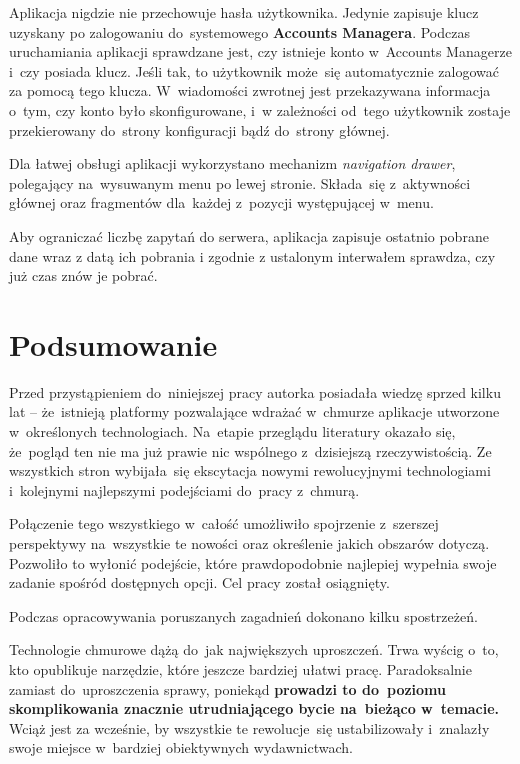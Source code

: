 \documentclass[12pt,a4paper,twoside,titlepage,openright]{book}
\begin{document}
Aplikacja nigdzie nie przechowuje hasła użytkownika. Jedynie zapisuje klucz uzyskany po zalogowaniu do~systemowego \textbf{Accounts Managera}. Podczas uruchamiania aplikacji sprawdzane jest, czy istnieje konto w~Accounts Managerze i~czy posiada klucz. Jeśli tak, to użytkownik może~się automatycznie zalogować za pomocą tego klucza. W~wiadomości zwrotnej jest przekazywana informacja o~tym, czy konto było skonfigurowane, i~w zależności od~tego użytkownik zostaje przekierowany do~strony konfiguracji bądź do~strony głównej.

Dla łatwej obsługi aplikacji wykorzystano mechanizm \textit{navigation drawer}, polegający na~wysuwanym menu po lewej stronie. Składa~się z~aktywności głównej oraz fragmentów dla~każdej z~pozycji występującej w~menu.

Aby ograniczać liczbę zapytań do serwera, aplikacja zapisuje ostatnio pobrane dane wraz z datą ich pobrania i zgodnie z ustalonym interwałem sprawdza, czy już czas znów je pobrać.


\chapter*{Podsumowanie}
 
Przed przystąpieniem do~niniejszej pracy autorka posiadała wiedzę sprzed kilku lat -- że~istnieją platformy pozwalające wdrażać w~chmurze aplikacje utworzone w~określonych technologiach. Na~etapie przeglądu literatury okazało się, że~pogląd ten nie ma już prawie nic wspólnego z~dzisiejszą rzeczywistością. Ze wszystkich stron wybijała~się ekscytacja nowymi rewolucyjnymi technologiami i~kolejnymi najlepszymi podejściami do~pracy z~chmurą. 

Połączenie tego wszystkiego w~całość umożliwiło spojrzenie z~szerszej perspektywy na~wszystkie te nowości oraz określenie jakich obszarów dotyczą. Pozwoliło to wyłonić podejście, które prawdopodobnie najlepiej wypełnia swoje zadanie spośród dostępnych opcji. Cel pracy został osiągnięty.

Podczas opracowywania poruszanych zagadnień dokonano kilku spostrzeżeń.

Technologie chmurowe dążą do~jak największych uproszczeń. Trwa wyścig o~to, kto opublikuje narzędzie, które jeszcze bardziej ułatwi pracę. Paradoksalnie zamiast do~uproszczenia sprawy, poniekąd \textbf{prowadzi to do~poziomu skomplikowania znacznie utrudniającego bycie na~bieżąco w~temacie.} Wciąż jest za wcześnie, by wszystkie te rewolucje~się ustabilizowały i~znalazły swoje miejsce w~bardziej obiektywnych wydawnictwach. 
\end{document}
